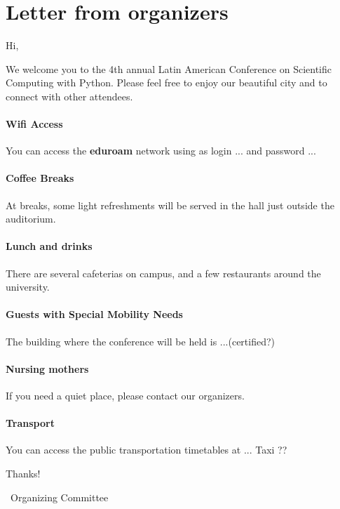 \section*{Letter from organizers}

Hi,

We welcome you to the 4th annual Latin American Conference on Scientific Computing with Python. Please feel free to enjoy our beautiful city and to connect with other attendees. 

\paragraph*{Wifi Access} You can access the \textbf{eduroam} network using as login ... and password ...

\paragraph*{Coffee Breaks} At breaks, some light refreshments will be served in the hall just outside the auditorium.

\paragraph*{Lunch and drinks} There are several cafeterias on campus, and a few restaurants around the university. 

\paragraph*{Guests with Special Mobility Needs} The building where the conference will be held is ...(certified?)

\paragraph*{Nursing mothers} If you need a quiet place, please contact our organizers.

\paragraph*{Transport} You can access the public transportation timetables at ... Taxi ??



\vfill

Thanks!

\textemdash\ Organizing Committee